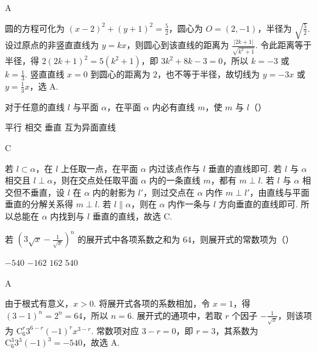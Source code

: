\begin{answer}
A
\end{answer}

\begin{solution}
圆的方程可化为 \(\left(x-2\right)^{2}+\left(y+1\right)^{2}=\frac{5}{2}\)，圆心为 \(O=(2,-1)\)，半径为 \(\sqrt{\frac{5}{2}}\). 设过原点的非竖直直线为 \(y=kx\)，则圆心到该直线的距离为 \(\frac{|2k+1|}{\sqrt{k^{2}+1}}\). 令此距离等于半径，得 \(2(2k+1)^{2}=5(k^{2}+1)\)，即 \(3k^{2}+8k-3=0\)，所以 \(k=-3\) 或 \(k=\frac{1}{3}\). 竖直直线 \(x=0\) 到圆心的距离为 \(2\)，也不等于半径，故切线为 \(y=-3x\) 或 \(y=\frac{1}{3}x\)，选 A.
\end{solution}

\begin{problem}
对于任意的直线 \(l\) 与平面 \(\alpha\)，在平面 \(\alpha\) 内必有直线 \(m\)，使 \(m\) 与 \(l\)（\quad）

\choices
    {平行}
    {相交}
    {垂直}
    {互为异面直线}
\end{problem}

\begin{answer}
C
\end{answer}

\begin{solution}
若 \(l\subset\alpha\)，在 \(l\) 上任取一点，在平面 \(\alpha\) 内过该点作与 \(l\) 垂直的直线即可. 若 \(l\) 与 \(\alpha\) 相交且 \(l\perp\alpha\)，则在交点处任取平面 \(\alpha\) 内的一条直线 \(m\)，都有 \(m\perp l\). 若 \(l\) 与 \(\alpha\) 相交但不垂直，设 \(l\) 在 \(\alpha\) 内的射影为 \(l'\)，则过交点在 \(\alpha\) 内作 \(m\perp l'\)，由直线与平面垂直的分解关系得 \(m\perp l\). 若 \(l\parallel\alpha\)，则在 \(\alpha\) 内作一条与 \(l\) 方向垂直的直线即可. 所以总能在 \(\alpha\) 内找到与 \(l\) 垂直的直线，故选 C.
\end{solution}

\begin{problem}
若 \(\left(3\sqrt{x} - \frac{1}{\sqrt{x}}\right)^{n}\) 的展开式中各项系数之和为 64，则展开式的常数项为（\quad）

\choices
    {\(-540\)}
    {\(-162\)}
    {\(162\)}
    {\(540\)}
\end{problem}

\begin{answer}
A
\end{answer}

\begin{solution}
由于根式有意义，\(x>0\). 将展开式各项的系数相加，令 \(x=1\)，得 \(\left(3-1\right)^{n}=2^{n}=64\)，所以 \(n=6\). 展开式的通项中，若取 \(r\) 个因子 \(-\frac{1}{\sqrt{x}}\)，则该项为 \(\mathrm C_{6}^{r}3^{6-r}(-1)^{r}x^{3-r}\). 常数项对应 \(3-r=0\)，即 \(r=3\)，其系数为 \(\mathrm C_{6}^{3}3^{3}(-1)^{3}=-540\)，故选 A.
\end{solution}

